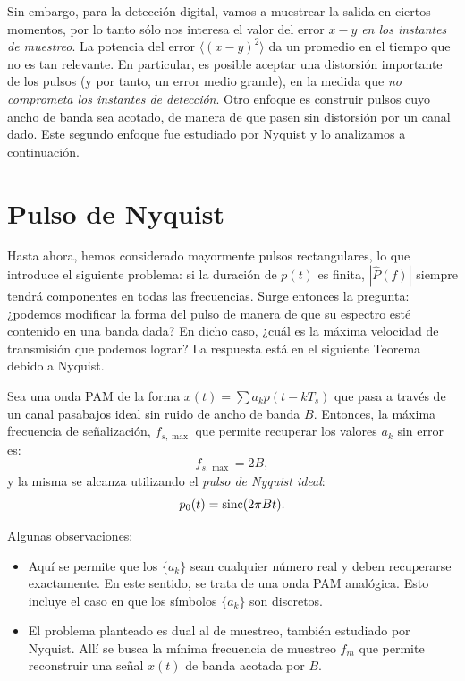 Sin embargo, para la detección digital, vamos a muestrear la salida en ciertos momentos, por lo tanto sólo nos interesa el valor del error $x-y$ \emph{en los instantes de muestreo}. La potencia del error $\langle(x-y)^2\rangle$ da un promedio en el tiempo que no es tan relevante. En particular, es posible aceptar una distorsión importante de los pulsos (y por tanto, un error medio grande), en la medida que \emph{no comprometa los instantes de detección}. Otro enfoque es construir pulsos cuyo ancho de banda sea acotado, de manera de que pasen sin distorsión por un canal dado. Este segundo enfoque fue estudiado por Nyquist y lo analizamos a continuación.

\section{Pulso de Nyquist}

Hasta ahora, hemos considerado mayormente pulsos rectangulares, lo que introduce el siguiente problema: si la duración de $p(t)$ es finita, $|\hat{P}(f)|$ siempre tendrá componentes en todas las frecuencias. Surge entonces la pregunta: ¿podemos modificar la forma del pulso de manera de que su espectro esté contenido en una banda dada? En dicho caso, ¿cuál es la máxima velocidad de transmisión que podemos lograr? La respuesta está en el siguiente Teorema debido a Nyquist.

\begin{teorema}\label{teorema:pulso nyquist}

    Sea una onda PAM de la forma $x(t)=\sum a_k p(t-kT_s)$ que pasa a través de un canal pasabajos ideal sin ruido de ancho de banda $B$. Entonces, la máxima frecuencia de señalización, $f_{s,\max}$ que permite recuperar los valores $a_k$ sin error es:
    \begin{equation*}
        f_{s,\max}= 2B,
    \end{equation*}
    y la misma se alcanza utilizando el \emph{pulso de Nyquist ideal}:
    \begin{equation}\label{eq:pulso nyquist ideal}
        p_0(t)= \operatorname{sinc} (2 \pi B t).
    \end{equation}
\end{teorema}

Algunas observaciones:
\begin{itemize}
        \item Aquí se permite que los $\{a_k\}$ sean cualquier número real y deben recuperarse exactamente. En este sentido, se trata de una onda PAM analógica. Esto incluye el caso en que los símbolos $\{a_k\}$ son discretos.
        \item El problema planteado es dual al de muestreo, también estudiado por Nyquist. Allí se busca la mínima frecuencia de muestreo $f_m$ que permite reconstruir una señal $x(t)$ de banda acotada por $B$.
\end{itemize}



